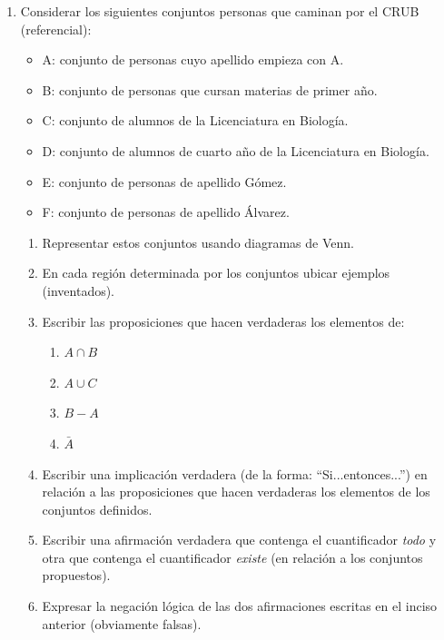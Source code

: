 \documentclass[12pt]{article}
\theoremstyle{definition}
\theoremstyle{remark}
\begin{document}
\begin{enumerate}
\item  Considerar los siguientes conjuntos personas que caminan por el CRUB (referencial):
\begin{itemize}
\setlength\itemsep{0em}
\item A: conjunto de personas cuyo apellido empieza con A.
\item B: conjunto de personas que cursan materias de primer año.
\item C: conjunto de alumnos de la Licenciatura en Biología. 
\item D: conjunto de alumnos de cuarto año de la Licenciatura en Biología.
\item E: conjunto de personas de apellido Gómez.
\item F: conjunto de personas de apellido Álvarez.
\end{itemize}
\begin{enumerate}
\setlength\itemsep{0em}
\item Representar estos conjuntos usando diagramas de Venn.
\item En cada región determinada por los conjuntos ubicar ejemplos (inventados).
\item Escribir las proposiciones que hacen verdaderas los elementos de:
 \begin{enumerate}
     \item $A \cap B$
     \item $A\cup C$
     \item $B -  A$
     \item $\bar{A}$
\end{enumerate}
\item Escribir una implicación verdadera (de la forma: “Si...entonces...”) en relación a las proposiciones que hacen verdaderas los elementos de los conjuntos definidos.
\item Escribir una afirmación verdadera que contenga el cuantificador \textit{todo} y otra que contenga el cuantificador \textit{existe} (en relación a los conjuntos propuestos).
\item Expresar la negación lógica de las dos afirmaciones escritas en el inciso anterior (obviamente falsas).
\end{enumerate}


\end{enumerate}
\end{document}
